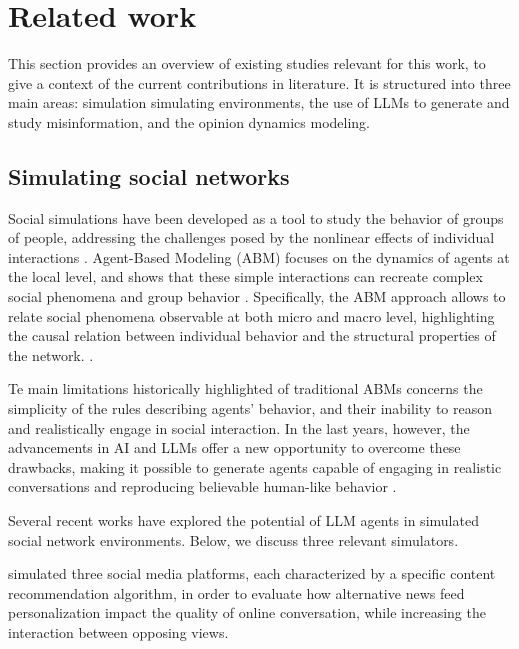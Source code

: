 \section{Related work}
\label{sec:relatedwork}

This section provides an overview of existing studies relevant for this work, to give a context of the current contributions in literature.
It is structured into three main areas: simulation simulating environments, the use of LLMs to generate and study misinformation, and the opinion dynamics modeling.

\subsection{Simulating social networks}

Social simulations have been developed as a tool to study the behavior of groups of people, addressing the challenges posed by the nonlinear effects of individual interactions \cite{squazzoni2014socialsimulation}.
Agent-Based Modeling (ABM) focuses on the dynamics of agents at the local level, and shows that these simple interactions can recreate complex social phenomena and group behavior \cite{macy2002abm}.
Specifically, the ABM approach allows to relate social phenomena observable at both micro and macro level, highlighting the causal relation between individual behavior and the structural properties of the network. \cite{squazzoni2014socialsimulation}.

Te main limitations historically highlighted of traditional ABMs concerns the simplicity of the rules \cite{conte2014agent} describing agents' behavior, and their inability to reason and realistically engage in social interaction.\cite{törnberg2023evaluate}
In the last years, however, the advancements in AI and LLMs offer a new opportunity to overcome these drawbacks, making it possible to generate agents capable of engaging in realistic conversations and reproducing believable human-like behavior \cite{park2023genagents}.

Several recent works have explored the potential of LLM agents in simulated social network environments. Below, we discuss three relevant simulators.

\medskip
\citet{törnberg2023evaluate} simulated three social media platforms, each characterized by a specific content recommendation algorithm, in order to evaluate how alternative news feed personalization impact the quality of online conversation, while increasing the interaction between opposing views.

